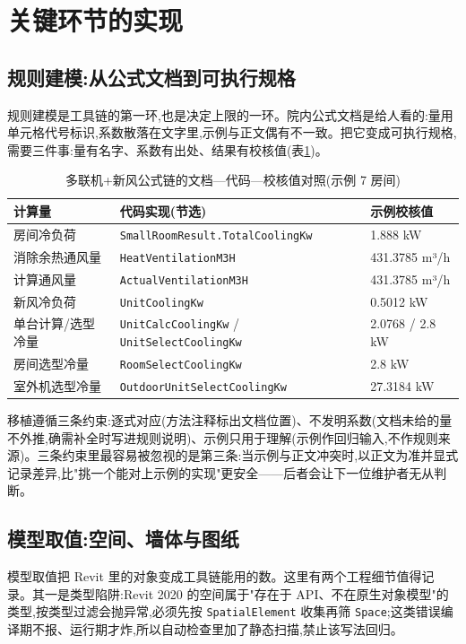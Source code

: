 \documentclass[UTF8,a4paper,zihao=-4]{ctexart}
\begin{document}
\section{关键环节的实现}

\subsection{规则建模:从公式文档到可执行规格}

规则建模是工具链的第一环,也是决定上限的一环。院内公式文档是给人看的:量用单元格代号标识,系数散落在文字里,示例与正文偶有不一致。把它变成可执行规格,需要三件事:量有名字、系数有出处、结果有校核值(表\ref{tab:formula})。

\begin{table}[H]
\centering
\caption{多联机+新风公式链的文档—代码—校核值对照(示例 7 房间)}\label{tab:formula}
\footnotesize
\begin{tabular}{p{3.1cm}p{5.6cm}p{4.1cm}}
\toprule
计算量 & 代码实现(节选) & 示例校核值 \\
\midrule
房间冷负荷 & \texttt{SmallRoomResult.TotalCoolingKw} & 1.888 kW \\
消除余热通风量 & \texttt{HeatVentilationM3H} & 431.3785 m³/h \\
计算通风量 & \texttt{ActualVentilationM3H} & 431.3785 m³/h \\
新风冷负荷 & \texttt{UnitCoolingKw} & 0.5012 kW \\
单台计算/选型冷量 & \texttt{UnitCalcCoolingKw} / \texttt{UnitSelectCoolingKw} & 2.0768 / 2.8 kW \\
房间选型冷量 & \texttt{RoomSelectCoolingKw} & 2.8 kW \\
室外机选型冷量 & \texttt{OutdoorUnitSelectCoolingKw} & 27.3184 kW \\
\bottomrule
\end{tabular}
\end{table}

移植遵循三条约束:逐式对应(方法注释标出文档位置)、不发明系数(文档未给的量不外推,确需补全时写进规则说明)、示例只用于理解(示例作回归输入,不作规则来源)。三条约束里最容易被忽视的是第三条:当示例与正文冲突时,以正文为准并显式记录差异,比"挑一个能对上示例的实现"更安全——后者会让下一位维护者无从判断。

\subsection{模型取值:空间、墙体与图纸}

模型取值把 Revit 里的对象变成工具链能用的数。这里有两个工程细节值得记录。其一是类型陷阱:Revit 2020 的空间属于"存在于 API、不在原生对象模型"的类型,按类型过滤会抛异常,必须先按 \texttt{SpatialElement} 收集再筛 \texttt{Space};这类错误编译期不报、运行期才炸,所以自动检查里加了静态扫描,禁止该写法回归。
\end{document}
